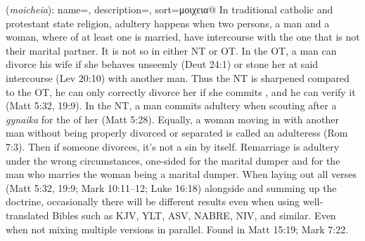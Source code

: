 \item[Adultery,]

(\textit{moicheia}):
{
    name=,
    description={},
    sort={μοιχεια@}
}
In traditional catholic and protestant state religion, adultery happens when two persons, a man and a woman, where of at least one is married, have intercourse with the one that is not their marital partner. It is not so in either NT or OT. In the OT, a man can divorce his wife if she behaves unseemly (Deut 24:1) or stone her at said intercourse (Lev 20:10) with another man. Thus the NT is sharpened compared to the OT, he can only correctly divorce her if she commits , and he can verify it (Matt 5:32, 19:9). In the NT, a man commits adultery when scouting after a \emph{gynaika} for the  of her (Matt 5:28). Equally, a woman moving in with another man without being properly divorced or separated is called an adulteress (Rom 7:3). Then if someone divorces, it’s not a sin by itself. Remarriage is adultery under the wrong circumstances, one-sided for the marital dumper and for the man who marries the woman being a marital dumper. When laying out all verses (Matt 5:32, 19:9; Mark 10:11--12; Luke 16:18) alongside and summing up the doctrine, occasionally there will be different results even when using well-translated Bibles such as KJV, YLT, ASV, NABRE, NIV, and similar. Even when not mixing multiple versions in parallel.
Found in Matt 15:19; Mark 7:22.
